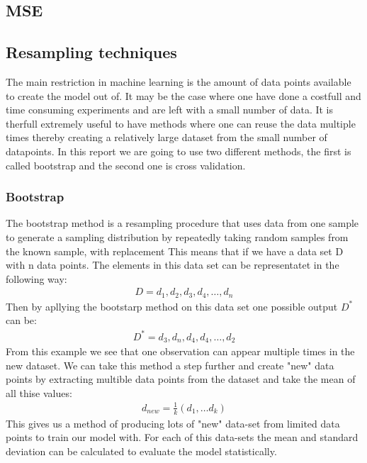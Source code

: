 \subsection{MSE}


\subsection{Resampling techniques}

\noindent The main restriction in machine learning is 
the amount of data points available to create the model out of. It may be the case where one have
done a costfull and time consuming experiments and are left with a small number of data. 
It is therfull extremely useful to have methods where one can reuse the data multiple times
thereby creating a relatively large dataset from the small number of datapoints. In this report
we are going to use two different methods, the first is called bootstrap and the second one is cross validation.

\subsubsection{Bootstrap} 
\noindent The bootstrap method is a resampling procedure that uses data from one 
sample to generate a sampling distribution by repeatedly taking random 
samples from the known sample, with replacement\cite{PSU} This means that if we have a data set D with n data points.
The elements in this data set can be representatet in the following way:
\begin{align}
    D = {d_1, d_2, d_3, d_4, \dots, d_n}
\end{align}
Then by apllying the bootstarp method on this data set one possible output $D^{*}$ can be:
\begin{align}
    D^{*} = {d_3, d_n, d_4, d_4 , \dots, d_2}
\end{align}
From this example we see that one observation can appear multiple times in the new dataset.
We can take this method a step further and create "new" data points by extracting multible data points from 
the dataset and take the mean of all thise values:
\begin{align}
    d_{new} = \frac{1}{k}(d_1, \dots d_k)
\end{align}
This gives us a method of producing lots of "new" data-set from 
limited data points to train our model with. For each of this data-sets
the mean and standard deviation can be calculated to evaluate the model statistically. \cite{MLM}


